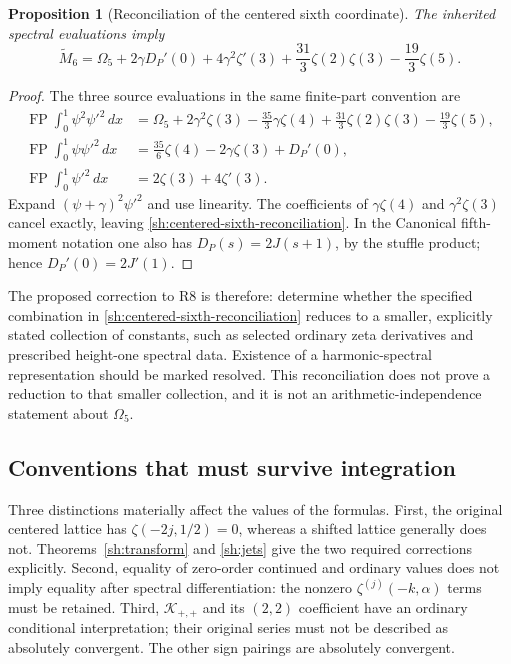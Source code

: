 \documentclass[11pt]{article}
\newtheorem{proposition}[theorem]{Proposition}
\theoremstyle{definition}
\theoremstyle{remark}
\numberwithin{equation}{section}
\DeclareMathOperator{\FP}{FP}
\begin{document}
\begin{proposition}[Reconciliation of the centered sixth coordinate]
\label{audit:sixth}
The inherited spectral evaluations imply
\begin{equation}\label{sh:centered-sixth-reconciliation}
 \boxed{\widetilde M_6
   =\Omega_5+2\gamma D_P'(0)+4\gamma^2\zeta'(3)
      +\frac{31}{3}\zeta(2)\zeta(3)-\frac{19}{3}\zeta(5).}
\end{equation}
\end{proposition}
\begin{proof}
The three source evaluations in the same finite-part convention are
\begin{align*}
 \FP\int_0^1\psi^2\psi'^2\,dx
 &=\Omega_5+2\gamma^2\zeta(3)-\frac{35}{3}\gamma\zeta(4)
       +\frac{31}{3}\zeta(2)\zeta(3)-\frac{19}{3}\zeta(5),\\
 \FP\int_0^1\psi\psi'^2\,dx
 &=\frac{35}{6}\zeta(4)-2\gamma\zeta(3)+D_P'(0),\\
 \FP\int_0^1\psi'^2\,dx
 &=2\zeta(3)+4\zeta'(3).
\end{align*}
Expand $(\psi+\gamma)^2\psi'^2$ and use linearity. The coefficients
of $\gamma\zeta(4)$ and $\gamma^2\zeta(3)$ cancel exactly, leaving
\eqref{sh:centered-sixth-reconciliation}. In the Canonical fifth-moment
notation one also has $D_P(s)=2J(s+1)$, by the stuffle product; hence
$D_P'(0)=2J'(1)$.
\end{proof}

The proposed correction to R8 is therefore: determine whether the
specified combination in \eqref{sh:centered-sixth-reconciliation}
reduces to a smaller, explicitly stated collection of constants, such
as selected ordinary zeta derivatives and prescribed height-one
spectral data. Existence of a harmonic-spectral representation should
be marked resolved. This reconciliation does not prove a reduction
to that smaller collection, and it is not an arithmetic-independence
statement about $\Omega_5$.

\subsection{Conventions that must survive integration}

Three distinctions materially affect the values of the formulas.
First, the original centered lattice has
$\zeta(-2j,1/2)=0$, whereas a shifted lattice generally does not.
Theorems~\ref{sh:transform} and \ref{sh:jets} give the two required
corrections explicitly. Second, equality of zero-order continued and
ordinary values does not imply equality after spectral differentiation:
the nonzero $\zeta^{(j)}(-k,\alpha)$ terms must be retained. Third,
$\mathcal K_{+,+}$ and its $(2,2)$ coefficient have an ordinary
conditional interpretation; their original series must not be
described as absolutely convergent. The other sign pairings are
absolutely convergent.
\end{document}
